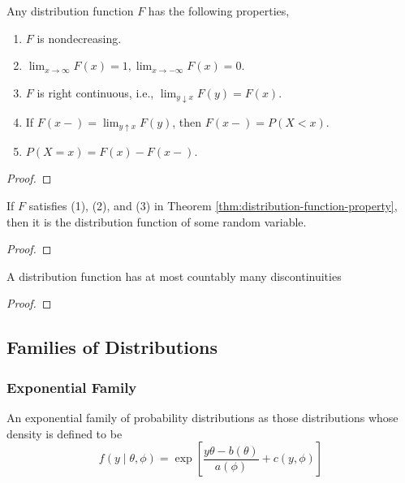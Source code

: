 \begin{theorem} \label{thm:distribution-function-property}
    Any distribution function $F$ has the following properties,
    \begin{enumerate}
        \item $F$ is nondecreasing.
        \item $\lim_{x\rightarrow\infty}F(x)=1,\lim_{x \rightarrow-\infty}F(x)=0$.
        \item $F$ is right continuous, i.e., $\lim_{y \downarrow x} F(y)=F(x)$.
        \item If $F(x-)=\lim_{y\uparrow x}F(y)$, then $F(x-)=P(X<x)$.
        \item $P(X=x)=F(x)-F(x-)$.
    \end{enumerate}
\end{theorem}

\begin{proof}

\end{proof}

\begin{theorem}
    If $F$ satisfies (1), (2), and (3) in Theorem \ref{thm:distribution-function-property}, then it is the distribution function of some random variable.
\end{theorem}

\begin{proof}

\end{proof}

\begin{theorem}
    A distribution function has at most countably many discontinuities
\end{theorem}

\begin{proof}

\end{proof}

\subsection{Families of Distributions}

\subsubsection{Exponential Family}

\begin{definition} \label{def:exponential-family}
    An exponential family of probability distributions as those distributions whose density is defined to be
    \begin{equation}
        f\left(y\mid\theta,\phi\right)=\exp\left[\frac{y\theta-b(\theta)}{a(\phi)}+c(y,\phi)\right]
    \end{equation}
\end{definition}

